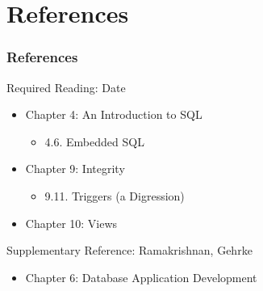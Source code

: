 \documentclass[dvipsnames]{beamer}
\theoremstyle{plain}
\begin{document}
\section*{References}

\begin{frame}
  \frametitle{References}

  \begin{block}{Required Reading: Date}
    \begin{itemize}
      \item Chapter 4: An Introduction to SQL
      \begin{itemize}
        \item 4.6. Embedded SQL
      \end{itemize}

      \item Chapter 9: Integrity
      \begin{itemize}
        \item 9.11. \alert{Triggers (a Digression)}
      \end{itemize}

      \item Chapter 10: \alert{Views}
    \end{itemize}
  \end{block}

  \begin{block}{Supplementary Reference: Ramakrishnan, Gehrke}
    \begin{itemize}
      \item Chapter 6: Database Application Development
    \end{itemize}
  \end{block}
\end{frame}
\end{document}
